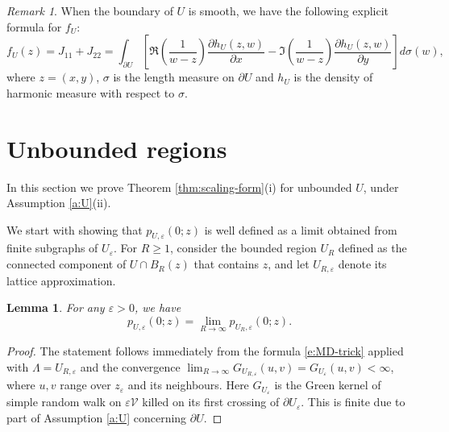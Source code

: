 \documentclass[11pt]{article}
\newtheorem{lemma}[theorem]{Lemma}
\theoremstyle{remark}
\newtheorem{remark}{Remark}
\def\eps{\varepsilon}
\def\cV{\mathcal{V}}
\newcommand{\eqn}[2]{\begin{equation}\label{#1}#2\end{equation}}
\begin{document}
\begin{remark}
When the boundary of $U$ is smooth, we have the following explicit formula for $f_U$:
\eqn{e:fU-formula}{
   f_U(z)
   = J_{11}+J_{22}
   = \int_{\partial U} \left[\Re\left(\frac{1}{w-z}\right) \frac{\partial h_U(z,w)}{\partial x}-\Im\left(\frac{1}{w-z}\right) \frac{\partial h_U(z,w)}{\partial y}\right] d\sigma(w), }
where $z = (x,y)$, $\sigma$ is the length measure on $\partial U$ and $h_U$ is the density of 
harmonic measure with respect to $\sigma$.
\end{remark}


\section{Unbounded regions}
\label{sec:unbounded}

In this section we prove Theorem \ref{thm:scaling-form}(i) for unbounded $U$, under Assumption
\ref{a:U}(ii).

We start with showing that $p_{U,\eps}(0;z)$ is well defined as a limit obtained from
finite subgraphs of $U_\eps$. For $R \ge 1$, consider the bounded region $U_R$ defined
as the connected component of $U \cap B_R(z)$ that contains $z$, and let $U_{R,\eps}$
denote its lattice approximation.

\begin{lemma}
\label{lem:limit-unbounded}
For any $\eps > 0$, we have
\eqn{e:limit-unbounded}
{ p_{U,\eps}(0;z)
  = \lim_{R \to \infty} p_{U_R,\eps}(0;z). }
\end{lemma}

\begin{proof}
The statement follows immediately from the formula \eqref{e:MD-trick} applied with 
$\Lambda = U_{R,\eps}$ and the convergence 
$\lim_{R \to \infty} G_{U_{R,\eps}}(u,v) = G_{U_\eps}(u,v) < \infty$, where $u,v$ 
range over $z_\eps$ and its neighbours. Here $G_{U_\eps}$ is the Green kernel of 
simple random walk on $\eps \cV$ killed on its first crossing of $\partial U_\eps$. 
This is finite due to part of Assumption \ref{a:U} concerning $\partial U$.
\end{proof}
\end{document}
